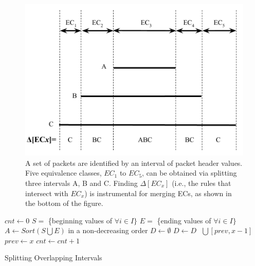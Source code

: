 \begin{figure}[t]
\centering
\includegraphics[scale=.52]{figures/DisjointECs.pdf}
\caption{A set of packets are identified by an interval of packet header values.
        Five equivalence classes, $EC_1$ to $EC_5$, can be obtained via splitting three intervals A, B and C.
        Finding $\Delta[EC_x]$ (i.e., the rules that intersect with $EC_x$) is instrumental for
        merging ECs, as shown in the bottom of the figure.}
\label{Fig:DisjointECsAsInterval}
\end{figure}

\begin{algorithm}[t]
\DontPrintSemicolon
{}
$cnt \gets 0$\;
$S = $ \{beginning values of $\forall i \in I\}$\;
$E = $ \{ending values of $\forall i \in I\}$\;
$A \gets Sort(S \bigcup E)$ in a non-decreasing order\;
$D \gets \emptyset$\;
 {
         {
                 {\label{Alg:LineEndStart1}
                        $D \gets D \text{ }\bigcup \text{} [prev, x-1]$\;
                }\label{Alg:LineEndStart2}
                $prev \gets x$\;\label{Alg:LineNewPrev1}
                $cnt \gets cnt + 1$\;
        }
}
\caption{Splitting Overlapping Intervals}
\label{Alg:GenDisjointECs}
\end{algorithm}

